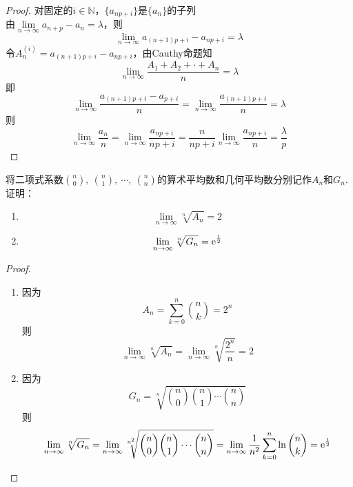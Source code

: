 \begin{proof}
    
    对固定的$i \in \mathbb{N}$，$\{a_{np + i}\}$是$\{a_{n}\}$的子列\\
    由$\lim\limits_{n\to\infty}{a_{n+p} - a_n} = \lambda$，则
    $$\lim\limits_{n\to\infty}{a_{(n+1)p + i} - a_{np+i}} = \lambda$$
    令$A^{(i)}_{n} = a_{(n+1)p+i} - a_{np + i}$，由\textup{Cauthy}命题知
    $$\lim\limits_{n\to\infty}{\dfrac{A_1 + A_2 + \cdot + A_n}{n}} = \lambda$$
    即
    $$\lim\limits_{n\to\infty}{\dfrac{a_{(n+1)p+i} - a_{p+i}}{n}} = \lim\limits_{n\to\infty}{\dfrac{a_{(n+1)p+i}}{n}} = \lambda$$
    则
    $$\lim\limits_{n\to\infty}{\dfrac{a_n}{n}} = \lim\limits_{n\to\infty}{\dfrac{a_{np+i}}{np+i}} = \dfrac{n}{np+i} \lim\limits_{n\to\infty}{\dfrac{a_{np+i}}{n}} = \dfrac{\lambda}{p}$$

\end{proof}

\begin{proposition}

    将二项式系数$\binom{n}{0},\ \binom{n}{1},\ \cdots, \ \binom{n}{n}$的算术平均数和几何平均数分别记作$A_n$和$G_n$. 证明：

    \begin{enumerate}

        \item 
                $$\lim\limits_{n\to\infty}{\sqrt[n]{A_n}} = 2$$
                
        \item   
                $$\lim\limits_{n\to\infty}{\sqrt[n]{G_n}} = \mathrm{e}^{\frac{1}{2}}$$

    \end{enumerate}

\end{proposition}

\begin{proof}

    \begin{enumerate}
        
        \item 
            因为$$A_n = \sum\limits_{k=0}^{n}{\binom{n}{k}} = 2^n$$则
            $$\lim\limits_{n\to\infty}{\sqrt[n]{A_n}} = \lim\limits_{n\to\infty}{\sqrt[n]{\dfrac{2^n}{n}}} = 2$$

        \item 
            因为$$G_n = \sqrt[n]{\binom{n}{0}\binom{n}{1}\cdots\binom{n}{n}}$$则
            $$\lim\limits_{n\to\infty}{\sqrt[n]{G_n}}  = \lim\limits_{n\to\infty}{\sqrt[n^2]{\binom{n}{0}\binom{n}{1}\cdots\binom{n}{n}}} = \lim\limits_{n\to\infty}{\dfrac{1}{n^2} \sum\limits_{k=0}^{n}{\ln{\binom{n}{k}}}} = \mathrm{e}^{\frac{1}{2}}  $$
    
        \end{enumerate}
    
\end{proof}

